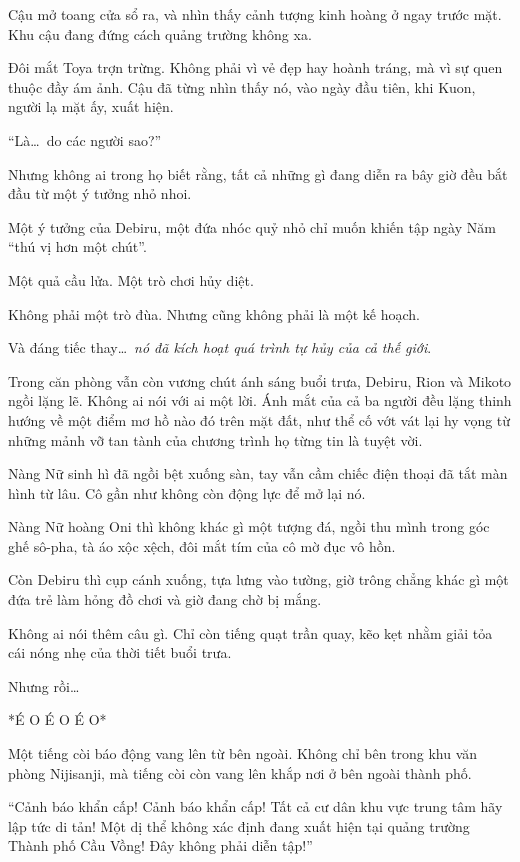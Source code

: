 \documentclass[../main.tex]{subfiles}
\begin{document}
Cậu mở toang cửa sổ ra, và nhìn thấy cảnh tượng kinh hoàng ở ngay trước mặt. Khu cậu đang đứng cách quảng trường không xa.

Đôi mắt Toya trợn trừng. Không phải vì vẻ đẹp hay hoành tráng, mà vì sự quen thuộc đầy ám ảnh. Cậu đã từng nhìn thấy nó, vào ngày đầu tiên, khi Kuon, người lạ mặt ấy, xuất hiện.

``Là\dots\ do các người sao?''

\il

Nhưng không ai trong họ biết rằng, tất cả những gì đang diễn ra bây giờ đều bắt đầu từ một ý tưởng nhỏ nhoi.

Một ý tưởng của Debiru, một đứa nhóc quỷ nhỏ chỉ muốn khiến tập ngày Năm ``thú vị hơn một chút''.

Một quả cầu lửa. Một trò chơi hủy diệt.

Không phải một trò đùa. Nhưng cũng không phải là một kế hoạch.

Và đáng tiếc thay\dots\ \emph{nó đã kích hoạt quá trình tự hủy của cả thế giới}.

\il

\ct

Trong căn phòng vẫn còn vương chút ánh sáng buổi trưa, Debiru, Rion và Mikoto ngồi lặng lẽ. Không ai nói với ai một lời. Ánh mắt của cả ba người đều lặng thinh hướng về một điểm mơ hồ nào đó trên mặt đất, như thể cố vớt vát lại hy vọng từ những mảnh vỡ tan tành của chương trình họ từng tin là tuyệt vời.

Nàng Nữ sinh hì đã ngồi bệt xuống sàn, tay vẫn cầm chiếc điện thoại đã tắt màn hình từ lâu. Cô gần như không còn động lực để mở lại nó.

Nàng Nữ hoàng Oni thì không khác gì một tượng đá, ngồi thu mình trong góc ghế sô-pha, tà áo xộc xệch, đôi mắt tím của cô mờ đục vô hồn.

Còn Debiru thì cụp cánh xuống, tựa lưng vào tường, giờ trông chẳng khác gì một đứa trẻ làm hỏng đồ chơi và giờ đang chờ bị mắng.

Không ai nói thêm câu gì. Chỉ còn tiếng quạt trần quay, kẽo kẹt nhằm giải tỏa cái nóng nhẹ của thời tiết buổi trưa.

Nhưng rồi\dots

*É O É O É O*

Một tiếng còi báo động vang lên từ bên ngoài. Không chỉ bên trong khu văn phòng Nijisanji, mà tiếng còi còn vang lên khắp nơi ở bên ngoài thành phố.

``Cảnh báo khẩn cấp! Cảnh báo khẩn cấp! Tất cả cư dân khu vực trung tâm hãy lập tức di tản! Một dị thể không xác định đang xuất hiện tại quảng trường Thành phố Cầu Vồng! Đây không phải diễn tập!''
\end{document}

